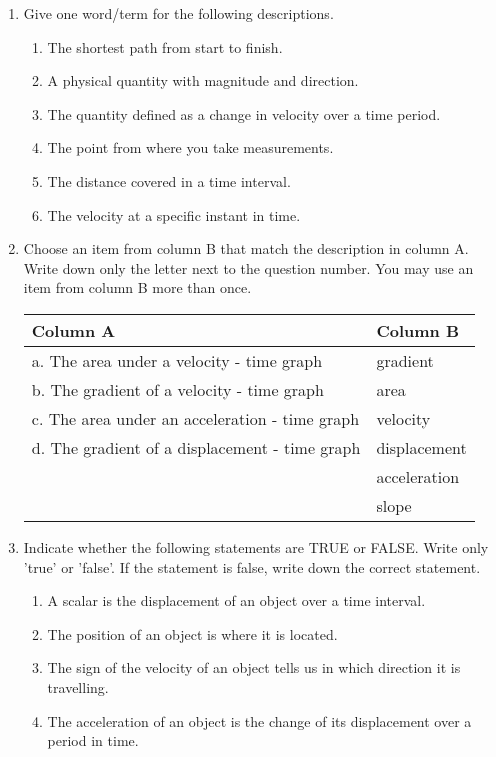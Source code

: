 \begin{enumerate}
\item Give one word/term for the following descriptions.
	\begin{enumerate}
	\item The shortest path from start to finish.
	\item A physical quantity with magnitude and direction.
	\item The quantity defined as a change in velocity over a time period.
	\item The point from where you take measurements.
	\item The distance covered in a time interval.
	\item The velocity at a specific instant in time.
	\end{enumerate}

\item Choose an item from column B that match the description in column A. Write down only the letter next to the question number. You may use an item from column B more than once.
	\begin{table}[htbp]
	\begin{center}
	\begin{tabular}{|l|l|}\hline
	Column A & Column B\\ \hline
	a. The area under a velocity - time graph & gradient\\
	b. The gradient of a velocity - time graph & area\\
	c. The area under an acceleration - time graph & velocity\\
	d. The gradient of a displacement - time graph & displacement\\
	 & acceleration\\
	 & slope\\ \hline
	\end{tabular}
	\end{center}
	\end{table}

\item Indicate whether the following statements are TRUE or FALSE. Write only 'true' or 'false'. If the statement is false, write down the correct statement.
	\begin{enumerate}
	\item A scalar is the displacement of an object over a time interval.
	\item The position of an object is where it is located.
	\item The sign of the velocity of an object tells us in which direction it is travelling.
	\item The acceleration of an object is the change of its displacement over a period in time.
	\end{enumerate}
	

\end{enumerate}
